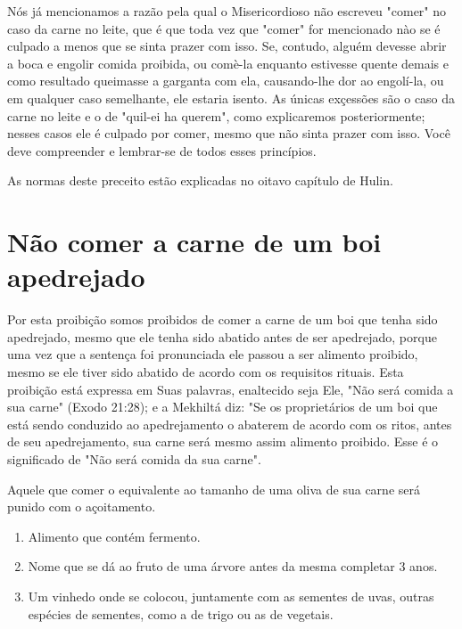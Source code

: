 \begin{itemize}
\begin{enumrate}
\begin{itemize}
\begin{itemize}
\begin{itemize}
Nós já mencionamos a razão pela qual o Misericordioso não escre­veu
"comer" no caso da carne no leite, que é que toda vez que "comer" for
mencionado nào se é culpado a menos que se sinta prazer com isso. Se,
contu­do, alguém devesse abrir a boca e engolir comida proibida, ou
comè-la enquanto estivesse quente demais e como resultado queimasse a
garganta com ela, causando-lhe dor ao engolí-la, ou em qualquer caso
semelhante, ele estaria isento. As únicas exçessões são o caso da carne
no leite e o de "quil-ei ha querem", como explicaremos posteriormente;
nesses casos ele é culpado por comer, mes­mo que não sinta prazer com
isso. Você deve compreender e lembrar-se de to­dos esses princípios.


As normas deste preceito estão explicadas no oitavo capítulo de Hulin.


\section{Não comer a carne de um boi apedrejado}

Por esta proibição somos proibidos de comer a carne de um boi que tenha
sido apedrejado, mesmo que ele tenha sido abatido antes de ser
apedre­jado, porque uma vez que a sentença foi pronunciada ele passou a
ser alimento proibido, mesmo se ele tiver sido abatido de acordo com os
requisitos rituais. Esta proibição está expressa em Suas palavras,
enaltecido seja Ele, "Não será comida a sua carne" (Exodo 21:28); e a
Mekhiltá diz: "Se os proprietários de um boi que está sendo conduzido ao
apedrejamento o abaterem de acordo com os ritos, antes de seu
apedrejamento, sua carne será mesmo assim alimento proi­bido. Esse é o
significado de "Não será comida da sua carne".

Aquele que comer o equivalente ao tamanho de uma oliva de sua carne será
punido com o açoitamento.


\begin{enumerate}
\def\labelenumi{\arabic{enumi}.}
\setcounter{enumi}{357}
\item
 
 Alimento que contém fermento.
 
\item
 
 Nome que se dá ao fruto de uma árvore antes da mesma completar 3 anos.
 
\item
 
 Um vinhedo onde se colocou, juntamente com as sementes de uvas, outras
 espécies de se­mentes, como a de trigo ou as de vegetais.
 

\end{enumerate}
\end{itemize}
\end{itemize}
\end{itemize}
\end{enumrate}
\end{itemize}
